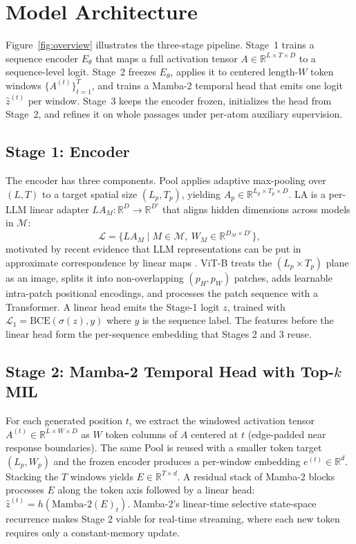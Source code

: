 \section{Model Architecture}
\label{sec:model}

Figure~\ref{fig:overview} illustrates the three-stage pipeline.
Stage~1 trains a sequence encoder $E_\theta$ that maps a full
activation tensor $A \in \mathbb{R}^{L \times T \times D}$ to a
sequence-level logit. Stage~2 freezes $E_\theta$, applies it to
centered length-$W$ token windows $\{A^{(t)}\}_{t=1}^{T}$, and trains
a Mamba-2 temporal head \citep{albertgu2024} that emits one
logit $\hat{z}^{(t)}$ per window. Stage~3 keeps the encoder frozen,
initializes the head from Stage~2, and refines it on whole passages
under per-atom auxiliary supervision.

\subsection{Stage 1: Encoder}
\label{sec:act_vit_subsec}

The encoder has three components. Pool applies adaptive
max-pooling over $(L, T)$ to a target spatial size $(L_p, T_p)$,
yielding $A_p \in \mathbb{R}^{L_p \times T_p \times D}$. LA
is a per-LLM linear adapter $LA_M : \mathbb{R}^D \to \mathbb{R}^{D'}$
that aligns hidden dimensions across models in $\mathcal{M}$:
\begin{equation}
\mathcal{L} = \{ LA_M \mid M \in \mathcal{M},\ W_M \in \mathbb{R}^{D_M \times D'} \},
\end{equation}
motivated by recent evidence that LLM representations can be put in
approximate correspondence by linear maps
\citep{huh2024,moschella2022,kornblith2019}. ViT-B treats the
$(L_p \times T_p)$ plane as an image, splits it into non-overlapping
$(p_H, p_W)$ patches, adds learnable intra-patch positional encodings,
and processes the patch sequence with a Transformer. A linear head
emits the Stage-1 logit $z$, trained with
$\mathcal{L}_{1} = \mathrm{BCE}(\sigma(z), y)$ where $y$ is the
sequence label. The features before the linear head form the
per-sequence embedding that Stages 2 and 3 reuse.

\subsection{Stage 2: Mamba-2 Temporal Head with Top-$k$ MIL}
\label{sec:temporal_head}

For each generated position $t$, we extract the windowed activation
tensor $A^{(t)} \in \mathbb{R}^{L \times W \times D}$ as $W$ token
columns of $A$ centered at $t$ (edge-padded near response boundaries).
The same Pool is reused with a smaller token target
$(L_p, W_p)$ and the frozen encoder produces a per-window embedding
$e^{(t)} \in \mathbb{R}^{d}$. Stacking the $T$ windows yields
$E \in \mathbb{R}^{T \times d}$. A residual stack of Mamba-2 blocks
processes $E$ along the token axis followed by a linear head:
$\hat{z}^{(t)} = h(\mathrm{Mamba\text{-}2}(E)_t)$.
Mamba-2's linear-time selective state-space recurrence makes Stage 2
viable for real-time streaming, where each new token requires only a
constant-memory update.

